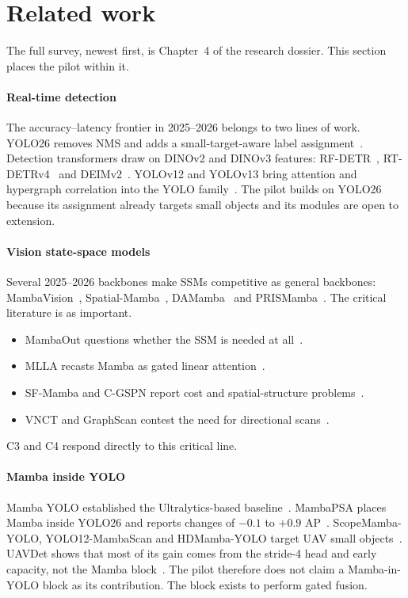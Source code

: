 \documentclass[11pt,a4paper]{article}
\begin{document}
\section{Related work}

The full survey, newest first, is Chapter~4 of the research dossier. This section
places the pilot within it.

\paragraph{Real-time detection}
The accuracy--latency frontier in 2025--2026 belongs to two lines of work. YOLO26
removes NMS and adds a small-target-aware label assignment~\citep{yolo26_2026}.
Detection transformers draw on DINOv2 and DINOv3 features:
RF-DETR~\citep{robinson2025rfdetr}, RT-DETRv4~\citep{rtdetrv4_2025} and
DEIMv2~\citep{deimv2_2025}. YOLOv12 and YOLOv13 bring attention and hypergraph
correlation into the YOLO family~\citep{tian2025yolov12,lei2025yolov13}. The pilot
builds on YOLO26 because its assignment already targets small objects and its modules
are open to extension.

\paragraph{Vision state-space models}
Several 2025--2026 backbones make SSMs competitive as general backbones:
MambaVision~\citep{hatamizadeh2025mambavision},
Spatial-Mamba~\citep{xiao2025spatialmamba}, DAMamba~\citep{damamba2025} and
PRISMamba~\citep{prismamba2026}. The critical literature is as important.
\begin{itemize}
  \item MambaOut questions whether the SSM is needed at all~\citep{yu2025mambaout}.
  \item MLLA recasts Mamba as gated linear attention~\citep{han2024mlla}.
  \item SF-Mamba and C-GSPN report cost and spatial-structure
        problems~\citep{sfmamba2026,cgspn2026}.
  \item VNCT and GraphScan contest the need for directional
        scans~\citep{vnct2026,graphscan2026}.
\end{itemize}
C3 and C4 respond directly to this critical line.

\paragraph{Mamba inside YOLO}
Mamba YOLO established the Ultralytics-based baseline~\citep{wang2025mambayolo}.
MambaPSA places Mamba inside YOLO26 and reports changes of $-0.1$ to $+0.9$
AP~\citep{mambapsa2026}. ScopeMamba-YOLO, YOLO12-MambaScan and HDMamba-YOLO target UAV
small objects~\citep{scopemamba2026,yolo12mambascan2026,hdmambayolo2026}. UAVDet
shows that most of its gain comes from the stride-4 head and early capacity, not the
Mamba block~\citep{yang2026uavdet}. The pilot therefore does not claim a
Mamba-in-YOLO block as its contribution. The block exists to perform gated fusion.
\end{document}
